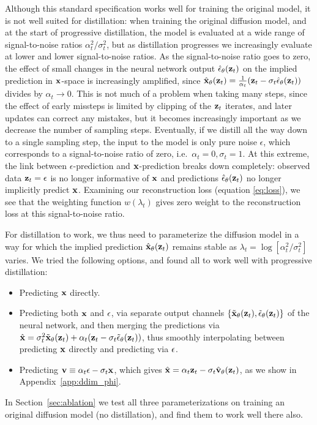 \documentclass[hidelinks]{article} %
\begin{document}
Although this standard specification works well for training the original model, it is not well suited for distillation: when training the original diffusion model, and at the start of progressive distillation, the model is evaluated at a wide range of signal-to-noise ratios $\alpha^2_t/\sigma^{2}_t$, but as distillation progresses we increasingly evaluate at lower and lower signal-to-noise ratios. As the signal-to-noise ratio goes to zero, the effect of small changes in the neural network output $\hat{{\mathbf{\epsilon}}}_{\theta}({\mathbf{z}}_t)$ on the implied prediction in ${\mathbf{x}}$-space is increasingly amplified, since $\hat{{\mathbf{x}}}_{\theta}({\mathbf{z}}_t) = \frac{1}{\alpha_t}({\mathbf{z}}_t - \sigma_t\hat{{\mathbf{\epsilon}}}_{\theta}({\mathbf{z}}_t))$ divides by $\alpha_t \rightarrow 0$. This is not much of a problem when taking many steps, since the effect of early missteps is limited by clipping of the ${\mathbf{z}}_t$ iterates, and later updates can correct any mistakes, but it becomes increasingly important as we decrease the number of sampling steps. Eventually, if we distill all the way down to a single sampling step, the input to the model is only pure noise $\epsilon$, which corresponds to a signal-to-noise ratio of zero, i.e.\ $\alpha_t=0, \sigma_t=1$. At this extreme, the link between $\epsilon$-prediction and ${\mathbf{x}}$-prediction breaks down completely: observed data ${\mathbf{z}}_t = \epsilon$ is no longer informative of ${\mathbf{x}}$ and predictions $\hat{{\mathbf{\epsilon}}}_{\theta}({\mathbf{z}}_t)$ no longer implicitly predict ${\mathbf{x}}$. Examining our reconstruction loss (equation \ref{eq:loss}), we see that the weighting function $w(\lambda_t)$ gives zero weight to the reconstruction loss at this signal-to-noise ratio.

For distillation to work, we thus need to parameterize the diffusion model in a way for which the implied prediction $\hat{{\mathbf{x}}}_{\theta}({\mathbf{z}}_t)$ remains stable as $\lambda_t = \log[\alpha^2_t/\sigma^{2}_t]$ varies. We tried the following options, and found all to work well with progressive distillation:
\begin{itemize}
    \item Predicting ${\mathbf{x}}$ directly.
    \item Predicting both ${\mathbf{x}}$ and ${\mathbf{\epsilon}}$, via separate output channels $\{\tilde{{\mathbf{x}}}_{\theta}({\mathbf{z}}_t), \tilde{{\mathbf{\epsilon}}}_{\theta}({\mathbf{z}}_t)\}$ of the neural network, and then merging the predictions via $\hat{{\mathbf{x}}} = \sigma^{2}_t\tilde{{\mathbf{x}}}_{\theta}({\mathbf{z}}_t) + \alpha_{t}({\mathbf{z}}_t - \sigma_t\tilde{{\mathbf{\epsilon}}}_{\theta}({\mathbf{z}}_t))$, thus smoothly interpolating between predicting ${\mathbf{x}}$ directly and predicting via ${\mathbf{\epsilon}}$.
    \item Predicting ${\mathbf{v}} \equiv \alpha_t{\mathbf{\epsilon}} - \sigma_{t}{\mathbf{x}}$, which gives $\hat{{\mathbf{x}}} = \alpha_t{\mathbf{z}}_t - \sigma_t\hat{{\mathbf{v}}}_{\theta}({\mathbf{z}}_t)$, as we show in Appendix~\ref{app:ddim_phi}.
\end{itemize}
In Section~\ref{sec:ablation} we test all three parameterizations on training an original diffusion model (no distillation), and find them to work well there also.
\end{document}

